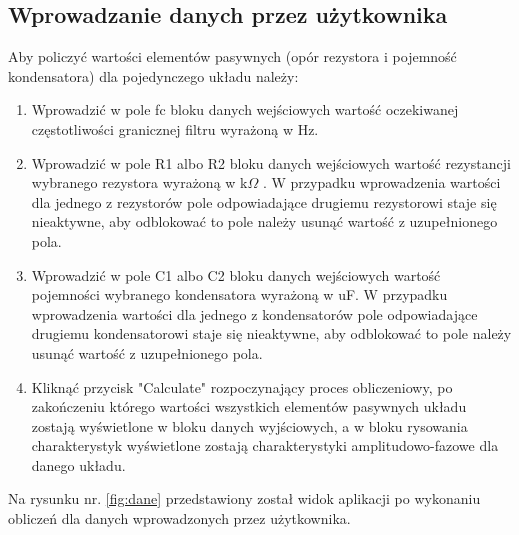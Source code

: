 \documentclass[a4paper,12pt]{article}
\begin{document}
	\subsection{Wprowadzanie danych przez użytkownika}
		Aby policzyć wartości elementów pasywnych (opór rezystora i pojemność kondensatora)
		dla pojedynczego układu należy:
		\begin{enumerate}
			\item Wprowadzić w pole fc bloku danych wejściowych wartość oczekiwanej
			częstotliwości granicznej filtru wyrażoną w Hz.
			\item Wprowadzić w pole R1 albo R2 bloku danych wejściowych wartość rezystancji
			wybranego rezystora wyrażoną w k$\Omega$ . W przypadku wprowadzenia wartości 
			dla jednego z rezystorów pole odpowiadające drugiemu rezystorowi staje się
		 	nieaktywne, aby odblokować to pole należy usunąć wartość z uzupełnionego pola.
		 	\item Wprowadzić w pole C1 albo C2 bloku danych wejściowych wartość pojemności
			wybranego kondensatora wyrażoną w uF. W przypadku wprowadzenia wartości 
			dla jednego z kondensatorów pole odpowiadające drugiemu kondensatorowi staje się
		 	nieaktywne, aby odblokować to pole należy usunąć wartość z uzupełnionego pola.
		 	\item Kliknąć przycisk "Calculate" rozpoczynający proces obliczeniowy, po 
		 	zakończeniu którego wartości wszystkich elementów pasywnych układu zostają
		 	wyświetlone w bloku danych wyjściowych, a w bloku rysowania charakterystyk
		 	wyświetlone zostają charakterystyki amplitudowo-fazowe dla danego układu.
		\end{enumerate}		

		Na rysunku nr. \ref{fig:dane} przedstawiony został widok aplikacji po 
		wykonaniu obliczeń dla danych wprowadzonych przez użytkownika.

		\pagebreak				
				
\end{document}
